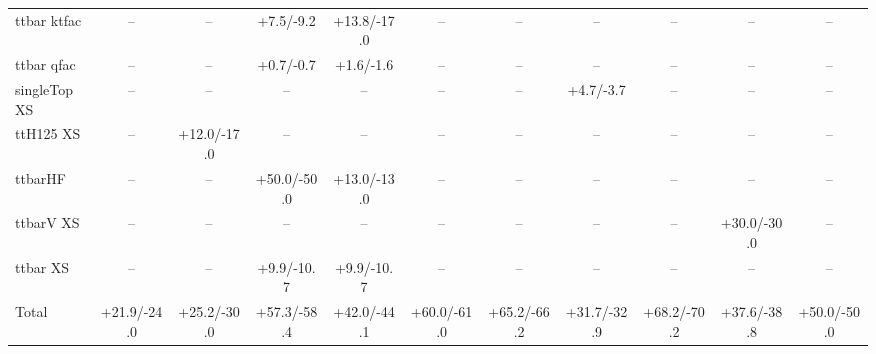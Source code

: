 \begin{tabular}{l*{10}{c}}
$$ttbar ktfac & -- & -- & +7.5/-9.2 & +13.8/-17.0 & -- & -- & -- & -- & -- & --\\
ttbar qfac & -- & -- & +0.7/-0.7 & +1.6/-1.6 & -- & -- & -- & -- & -- & --\\
singleTop XS & -- & -- & -- & -- & -- & -- & +4.7/-3.7 & -- & -- & --\\
ttH125 XS & -- & +12.0/-17.0 & -- & -- & -- & -- & -- & -- & -- & --\\
ttbarHF & -- & -- & +50.0/-50.0 & +13.0/-13.0 & -- & -- & -- & -- & -- & --\\
ttbarV XS & -- & -- & -- & -- & -- & -- & -- & -- & +30.0/-30.0 & --\\
ttbar XS & -- & -- & +9.9/-10.7 & +9.9/-10.7 & -- & -- & -- & -- & -- & --\\
\midrule
Total & +21.9/-24.0 & +25.2/-30.0 & +57.3/-58.4 & +42.0/-44.1 & +60.0/-61.0 & +65.2/-66.2 & +31.7/-32.9 & +68.2/-70.2 & +37.6/-38.8 & +50.0/-50.0\\
\bottomrule
\end{tabular}
